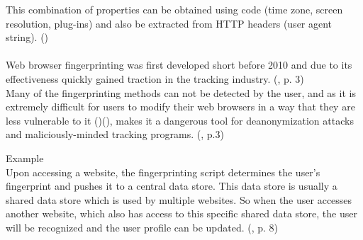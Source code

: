 This combination of properties can be obtained using code (time zone, screen resolution, plug-ins) and also be extracted from HTTP headers (user agent string). (\textcite{miele18}) \\\\
Web browser fingerprinting was first developed short before 2010 and due to its effectiveness quickly gained traction in the tracking industry. (\textcite{havens16}, p. 3) \\
Many of the fingerprinting methods can not be detected by the user, and as it is extremely difficult for users to modify their web browsers in a way that they are less vulnerable to it (\textcite{amiunique})(\textcite{miele18}), makes it a dangerous tool for deanonymization attacks and maliciously-minded tracking programs. (\textcite{havens16}, p.3)\\
\begin{tcolorbox}
Example\\
Upon accessing a website, the fingerprinting script determines the user's fingerprint and pushes it to a central data store. This data store is usually a shared data store which is used by multiple websites. So when the user accesses another website, which also has access to this specific shared data store, the user will be recognized and the user profile can be updated. (\textcite{havens16}, p. 8)
\end{tcolorbox}


